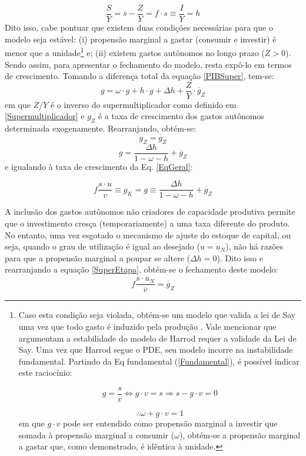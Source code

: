 \begin{equation}
\label{frac_h}
\frac{S}{Y} = \overline{s} - \frac{Z}{Y} = f\cdot s \equiv \frac{I}{Y} = h
\end{equation}
Dito isso, cabe pontuar que  existem duas condições necessárias para que o modelo seja estável: (i) propensão marginal a gastar (consumir e investir) é menor que a unidade\footnote{
	Caso esta condição seja violada, obtém-se um modelo que valida a lei de Say uma vez que todo gasto é induzido pela produção \cite[p.~ 75]{serrano_sraffian_1995}.
	Vale mencionar que \textcite{serrano_trouble_2017} argumentam a estabilidade do modelo de Harrod requer a validade da Lei de Say. Uma vez que Harrod segue o PDE, seu modelo incorre na instabilidade fundamental. Partindo da Eq fundamental (\ref{Fundamental}), é possível indicar este raciocínio:
	
	$$
	g = \frac{s}{v} \Leftrightarrow g\cdot v = s \Rightarrow s - g\cdot v = 0
	$$
	
	$$
	\therefore \omega + g\cdot v = 1
	$$
	em que $g\cdot v$ pode ser entendido como propensão marginal a investir que somada à propensão marginal a consumir ($\omega$), obtém-se a propensão marginal a gastar que, como demonstrado, é idêntica à unidade.
} e; (ii) existem gastos autônomos no longo prazo ($Z > 0$).
Sendo assim, para apresentar o fechamento do modelo, resta expô-lo em termos de crescimento.
Tomando a diferença total da equação \ref{PIBSuper}, tem-se:
$$
g = \omega\cdot g + h\cdot g + \Delta h + \frac{Z}{Y}\cdot \overline g_Z
$$
em que $Z/Y$ é o inverso do supermultiplicador como definido em \ref{Supermultiplicador} e $g_Z$ é a taxa de crescimento dos gastos autônomos determinada exogenamente. Rearranjando, obtém-se:
$$
g_Z = \overline g_Z
$$
\begin{equation}
\label{crescimentosuper}
g = \frac{\Delta h}{1 - \omega - h} + \overline g_Z
\end{equation}
e igualando à taxa de crescimento da Eq. \ref{EqGeral}:

\begin{equation}
\label{SuperEtapa}
f\frac{s\cdot u}{v} \equiv g_K = g \equiv \frac{\Delta h}{1 - \omega - h} + \overline g_Z
\end{equation}


A inclusão dos gastos autônomos não criadores de capacidade produtiva permite que o investimento cresça (temporariamente) a uma taxa diferente do produto.
No entanto, uma vez esgotado o mecanismo de ajuste do estoque de capital, ou seja, quando o grau de utilização é igual ao desejado ($u = u_N$), não há razões para que a propensão marginal a poupar se altere ($\Delta h = 0$). 
Dito isso e rearranjando a equação \ref{SuperEtapa}, obtém-se o fechamento deste modelo:
$$
f\frac{\overline s\cdot \overline u_N}{\overline v} = \overline g_Z
$$

